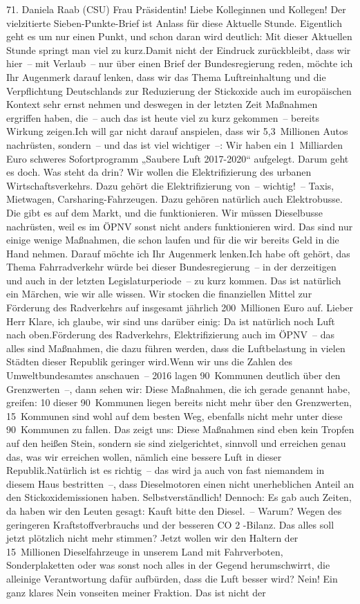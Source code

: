 \documentclass{article}
\begin{document}
	71. Daniela Raab (CSU) Frau Präsidentin! Liebe Kolleginnen und Kollegen! Der vielzitierte Sieben-Punkte-Brief ist Anlass für diese Aktuelle Stunde. Eigentlich geht es um nur einen Punkt, und schon daran wird deutlich: Mit dieser Aktuellen Stunde springt man viel zu kurz.Damit nicht der Eindruck zurückbleibt, dass wir hier – mit Verlaub – nur über einen Brief der Bundesregierung reden, möchte ich Ihr Augenmerk darauf lenken, dass wir das Thema Luftreinhaltung und die Verpflichtung Deutschlands zur Reduzierung der Stickoxide auch im europäischen Kontext sehr ernst nehmen und deswegen in der letzten Zeit Maßnahmen ergriffen haben, die – auch das ist heute viel zu kurz gekommen – bereits Wirkung zeigen.Ich will gar nicht darauf anspielen, dass wir 5,3 Millionen Autos nachrüsten, sondern – und das ist viel wichtiger –: Wir haben ein 1 Milliarden Euro schweres Sofortprogramm „Saubere Luft 2017-2020“ aufgelegt. Darum geht es doch. Was steht da drin? Wir wollen die Elektrifizierung des urbanen Wirtschaftsverkehrs. Dazu gehört die Elektrifizierung von – wichtig! – Taxis, Mietwagen, Carsharing-Fahrzeugen. Dazu gehören natürlich auch Elektrobusse. Die gibt es auf dem Markt, und die funktionieren. Wir müssen Dieselbusse nachrüsten, weil es im ÖPNV sonst nicht anders funktionieren wird. Das sind nur einige wenige Maßnahmen, die schon laufen und für die wir bereits Geld in die Hand nehmen. Darauf möchte ich Ihr Augenmerk lenken.Ich habe oft gehört, das Thema Fahrradverkehr würde bei dieser Bundesregierung – in der derzeitigen und auch in der letzten Legislaturperiode – zu kurz kommen. Das ist natürlich ein Märchen, wie wir alle wissen. Wir stocken die finanziellen Mittel zur Förderung des Radverkehrs auf insgesamt jährlich 200 Millionen Euro auf. Lieber Herr Klare, ich glaube, wir sind uns darüber einig: Da ist natürlich noch Luft nach oben.Förderung des Radverkehrs, Elektrifizierung auch im ÖPNV – das alles sind Maßnahmen, die dazu führen werden, dass die Luftbelastung in vielen Städten dieser Republik geringer wird.Wenn wir uns die Zahlen des Umweltbundesamtes anschauen – 2016 lagen 90 Kommunen deutlich über den Grenzwerten –, dann sehen wir: Diese Maßnahmen, die ich gerade genannt habe, greifen: 10 dieser 90 Kommunen liegen bereits nicht mehr über den Grenzwerten, 15 Kommunen sind wohl auf dem besten Weg, ebenfalls nicht mehr unter diese 90 Kommunen zu fallen. Das zeigt uns: Diese Maßnahmen sind eben kein Tropfen auf den heißen Stein, sondern sie sind zielgerichtet, sinnvoll und erreichen genau das, was wir erreichen wollen, nämlich eine bessere Luft in dieser Republik.Natürlich ist es richtig – das wird ja auch von fast niemandem in diesem Haus bestritten –, dass Dieselmotoren einen nicht unerheblichen Anteil an den Stickoxidemissionen haben. Selbstverständlich! Dennoch: Es gab auch Zeiten, da haben wir den Leuten gesagt: Kauft bitte den Diesel. – Warum? Wegen des geringeren Kraftstoffverbrauchs und der besseren CO 2 -Bilanz. Das alles soll jetzt plötzlich nicht mehr stimmen? Jetzt wollen wir den Haltern der 15 Millionen Dieselfahrzeuge in unserem Land mit Fahrverboten, Sonderplaketten oder was sonst noch alles in der Gegend herumschwirrt, die alleinige Verantwortung dafür aufbürden, dass die Luft besser wird? Nein! Ein ganz klares Nein vonseiten meiner Fraktion. Das ist nicht der 
\end{document}
